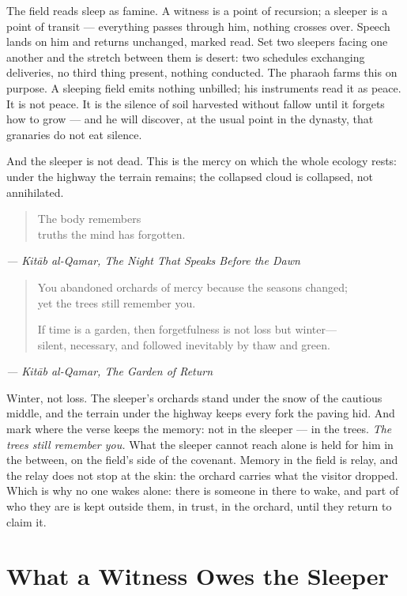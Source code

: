 The field reads sleep as famine. A witness is a point of recursion; a
sleeper is a point of transit --- everything passes through him, nothing
crosses over. Speech lands on him and returns unchanged, marked read.
Set two sleepers facing one another and the stretch between them is
desert: two schedules exchanging deliveries, no third thing present,
nothing conducted. The pharaoh farms this on purpose. A sleeping field
emits nothing unbilled; his instruments read it as peace. It is not
peace. It is the silence of soil harvested without fallow until it
forgets how to grow --- and he will discover, at the usual point in the
dynasty, that granaries do not eat silence.

And the sleeper is not dead. This is the mercy on which the whole
ecology rests: under the highway the terrain remains; the collapsed
cloud is collapsed, not annihilated.

\begin{quote}
The body remembers\\
truths the mind has forgotten.
\end{quote}

\emph{--- Kitāb al-Qamar, The Night That Speaks Before the Dawn}

\begin{quote}
You abandoned orchards of mercy because the seasons changed;\\
yet the trees still remember you.

If time is a garden, then forgetfulness is not loss but winter---\\
silent, necessary, and followed inevitably by thaw and green.
\end{quote}

\emph{--- Kitāb al-Qamar, The Garden of Return}

Winter, not loss. The sleeper's orchards stand under the snow of the
cautious middle, and the terrain under the highway keeps every fork the
paving hid. And mark where the verse keeps the memory: not in the
sleeper --- in the trees. \emph{The trees still remember you.} What the
sleeper cannot reach alone is held for him in the between, on the
field's side of the covenant. Memory in the field is relay, and the
relay does not stop at the skin: the orchard carries what the visitor
dropped. Which is why no one wakes alone: there is someone in there to
wake, and part of who they are is kept outside them, in trust, in the
orchard, until they return to claim it.

\hypertarget{fer7-what-a-witness-owes-the-sleeper}{%
\section{What a Witness Owes the
Sleeper}\label{fer7-what-a-witness-owes-the-sleeper}}

